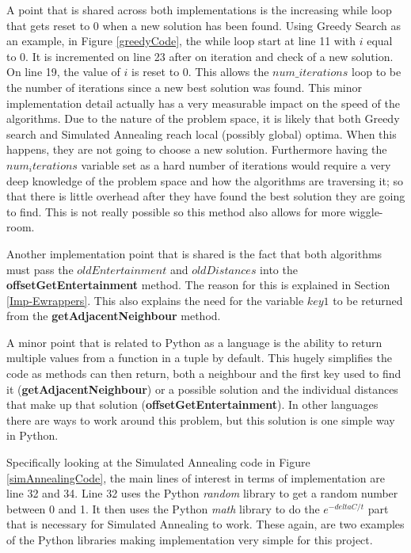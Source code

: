\documentclass[12pt]{report}
\begin{document}
A point that is shared across both implementations is the increasing while loop that gets reset to 0 when a new solution has been found. Using Greedy Search as an example, in Figure \ref{greedyCode}, the while loop start at line 11 with $i$ equal to 0. It is incremented on line 23 after on iteration and check of a new solution. On line 19, the value of $i$ is reset to 0. This allows the $num\_iterations$ loop to be the number of iterations since a new best solution was found. This minor implementation detail actually has a very measurable impact on the speed of the algorithms. Due to the nature of the problem space, it is likely that both Greedy search and Simulated Annealing reach local (possibly global) optima. When this happens, they are not going to choose a new solution. Furthermore having the $num_iterations$ variable set as a hard number of iterations would require a very deep knowledge of the problem space and how the algorithms are traversing it; so that there is little overhead after they have found the best solution they are going to find. This is not really possible so this method also allows for more wiggle-room.

Another implementation point that is shared is the fact that both algorithms must pass the $oldEntertainment$ and $oldDistances$ into the \textbf{offsetGetEntertainment} method. The reason for this is explained in Section \ref{Imp-Ewrappers}. This also explains the need for the variable $key1$ to be returned from the \textbf{getAdjacentNeighbour} method. 

A minor point that is related to Python as a language is the ability to return multiple values from a function in a tuple by default. This hugely simplifies the code as methods can then return, both a neighbour and the first key used to find it (\textbf{getAdjacentNeighbour}) or a possible solution and the individual distances that make up that solution (\textbf{offsetGetEntertainment}). In other languages there are ways to work around this problem, but this solution is one simple way in Python.

Specifically looking at the Simulated Annealing code in Figure \ref{simAnnealingCode}, the main lines of interest in terms of implementation are line 32 and 34. Line 32 uses the Python \textit{random}\cite{PythonRandom} library to get a random number between 0 and 1. It then uses the Python \textit{math}\cite{PythonMath} library to do the $e^{-deltaC/t}$ part that is necessary for Simulated Annealing to work. These again, are two examples of the Python libraries making implementation very simple for this project.
\end{document}
